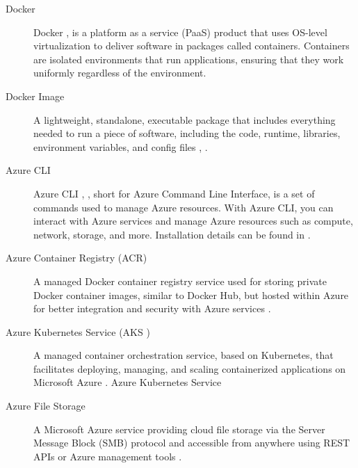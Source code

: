 \documentclass{article}
\begin{document}
\begin{description}
	\item[Docker]  Docker \cite{docker}, \cite{docker_use} is a platform as a service (PaaS) product that uses OS-level virtualization to deliver software in packages called containers. Containers are isolated environments that run applications, ensuring that they work uniformly regardless of the environment. 
    \item[Docker Image] A lightweight, standalone, executable package that includes everything needed to run a piece of software, including the code, runtime, libraries, environment variables, and config files \cite{docker}, \cite{azure}.
 \item[Azure CLI] Azure CLI \cite{azurecli}, \cite{azlist}, short for Azure Command Line Interface, is a set of commands used to manage Azure resources. With Azure CLI, you can interact with Azure services and manage Azure resources such as compute, network, storage, and more. Installation details can be found in \cite{azurecliinstall}. 
    \item[Azure Container Registry (ACR)] A managed Docker container registry service used for storing private Docker container images, similar to Docker Hub, but hosted within Azure for better integration and security with Azure services \cite{azure}.  

    \item[Azure Kubernetes Service (AKS )] A managed container orchestration service, based on Kubernetes, that facilitates deploying, managing, and scaling containerized applications on Microsoft Azure \cite{azure}. Azure Kubernetes Service
    \item[Azure File Storage] A Microsoft Azure service providing cloud file storage via the Server Message Block (SMB) protocol and accessible from anywhere using REST APIs or Azure management tools \cite{azure}. 


\end{description}
\end{document}
